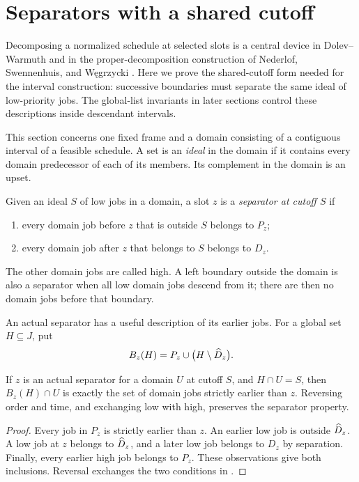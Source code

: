 \section{Separators with a shared cutoff}\label{sec:separators}

Decomposing a normalized schedule at selected slots is a central device
in Dolev--Warmuth \citep[Theorem~2]{DW1984} and in the proper-decomposition
construction of Nederlof, Swennenhuis, and Węgrzycki
\citep[Section~3]{NSW2025}. Here we prove the shared-cutoff form needed
for the interval construction: successive boundaries must separate the
same ideal of low-priority jobs. The global-list invariants in later
sections control these descriptions inside descendant intervals.

This section concerns one fixed frame and a domain consisting of a
contiguous interval of a feasible schedule. A set is an \emph{ideal}
in the domain if it contains every domain predecessor of each of its
members. Its complement in the domain is an upset.

\begin{definition}\label{def:separator}
Given an ideal \(S\) of low jobs in a domain, a slot \(z\) is a
\emph{separator at cutoff \(S\)} if
\begin{enumerate}[label=(\alph*)]
 \item every domain job before \(z\) that is outside \(S\) belongs to \(P_z\);
 \item every domain job after \(z\) that belongs to \(S\) belongs to \(D_z\).
\end{enumerate}
The other domain jobs are called high. A left boundary outside the domain
is also a separator when all low domain jobs descend from it; there are
then no domain jobs before that boundary.
\end{definition}

An actual separator has a useful description of its earlier jobs. For
a global set \(H\subseteq J\), put
\begin{equation}
 B_z(H)=P_z\cup\bigl(H\setminus\widehat D_{z}\bigr).
 \label{eq:B-definition}
\end{equation}

\begin{lemma}\label{lem:separator-description}
If \(z\) is an actual separator for a domain \(U\) at cutoff \(S\),
and \(H\cap U=S\), then \(B_z(H)\cap U\) is exactly the set of
domain jobs strictly earlier than \(z\). Reversing order and time,
and exchanging low with high, preserves the separator property.
\end{lemma}
\begin{proof}
Every job in \(P_z\) is strictly earlier than \(z\). An earlier low
job is outside \(\widehat D_{z}\). A low job at \(z\) belongs to \(\widehat D_{z}\),
and a later low job belongs to \(D_z\) by separation. Finally, every
earlier high job belongs to \(P_z\). These observations give both
inclusions. Reversal exchanges the two conditions in
.
\end{proof}


